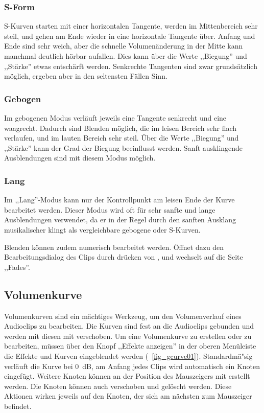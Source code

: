 \subsubsection{S-Form}
S-Kurven starten mit einer horizontalen Tangente, werden im Mittenbereich sehr steil, und gehen am Ende wieder in eine horizontale Tangente über. Anfang und Ende sind sehr weich, aber die schnelle Volumenänderung in der Mitte kann manchmal deutlich hörbar aufallen. Dies kann über die Werte ,,Biegung'' und ,,Stärke'' etwas entschärft werden. Senkrechte Tangenten sind zwar grundsätzlich möglich, ergeben aber in den seltensten Fällen Sinn.

\subsubsection{Gebogen}
Im gebogenen Modus verläuft jeweils eine Tangente senkrecht und eine waagrecht. Dadurch sind Blenden möglich, die im leisen Bereich sehr flach verlaufen, und im lauten Bereich sehr steil. Über die Werte ,,Biegung'' und ,,Stärke'' kann der Grad der Biegung beeinflusst werden. Sanft ausklingende Ausblendungen sind mit diesem Modus möglich.

\subsubsection{Lang}
Im ,,Lang''-Modus kann nur der Kontrollpunkt am leisen Ende der Kurve bearbeitet werden. Dieser Modus wird oft für sehr sanfte und lange Ausblendungen verwendet, da er in der Regel durch den sanften Ausklang musikalischer klingt als vergleichbare gebogene oder S-Kurven.

Blenden können zudem numerisch bearbeitet werden. Öffnet dazu den Bearbeitungsdialog des Clips durch drücken von , und wechselt auf die Seite ,,Fades''.

\subsection{Volumenkurve}
Volumenkurven sind ein mächtiges Werkzeug, um den Volumenverlauf eines Audioclips zu bearbeiten. Die Kurven sind fest an die Audioclips gebunden und werden mit diesen mit verschoben. Um eine Volumenkurve zu erstellen oder zu bearbeiten, müssen über den Knopf ,,Effekte anzeigen'' in der oberen Menüleiste die Effekte und Kurven eingeblendet werden (\FigB~\ref{fig_gcurve01}). Standardmä"sig verläuft die Kurve bei 0~dB, am Anfang jedes Clips wird automatisch ein Knoten eingefügt. Weitere Knoten können an der Position des Mauszeigers mit  erstellt werden. Die Knoten können auch verschoben  und gelöscht  werden. Diese Aktionen wirken jeweils auf den Knoten, der sich am nächsten zum Mauszeiger befindet.

